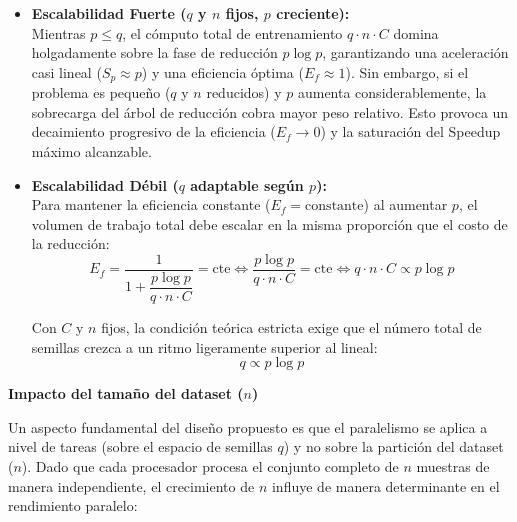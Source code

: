 \documentclass[11pt, a4paper]{article}
\begin{document}
\begin{itemize}
    \item \textbf{Escalabilidad Fuerte ($q$ y $n$ fijos, $p$ creciente):}\\
    Mientras $p \le q$, el cómputo total de entrenamiento $q \cdot n \cdot C$ domina holgadamente sobre la fase de reducción $p \log p$, garantizando una aceleración casi lineal ($S_p \approx p$) y una eficiencia óptima ($E_f \approx 1$). Sin embargo, si el problema es pequeño ($q$ y $n$ reducidos) y $p$ aumenta considerablemente, la sobrecarga del árbol de reducción cobra mayor peso relativo. Esto provoca un decaimiento progresivo de la eficiencia ($E_f \to 0$) y la saturación del Speedup máximo alcanzable.

    \item \textbf{Escalabilidad Débil ($q$ adaptable según $p$):}\\
    Para mantener la eficiencia constante ($E_f = \text{constante}$) al aumentar $p$, el volumen de trabajo total debe escalar en la misma proporción que el costo de la reducción:
    $$E_f = \frac{1}{1 + \dfrac{p \log p}{q \cdot n \cdot C}} = \text{cte} \iff \frac{p \log p}{q \cdot n \cdot C} = \text{cte} \iff q \cdot n \cdot C \propto p \log p$$

    Con $C$ y $n$ fijos, la condición teórica estricta exige que el número total de semillas crezca a un ritmo ligeramente superior al lineal:
    $$q \propto p \log p$$
\end{itemize}

\textbf{Impacto del tamaño del dataset ($n$) }

Un aspecto fundamental del diseño propuesto es que el paralelismo se aplica a nivel de tareas (sobre el espacio de semillas $q$) y no sobre la partición del dataset ($n$). Dado que cada procesador procesa el conjunto completo de $n$ muestras de manera independiente, el crecimiento de $n$ influye de manera determinante en el rendimiento paralelo:
\end{document}
